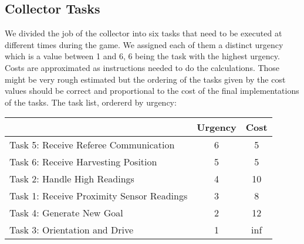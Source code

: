 \documentclass[12pt]{article}
\begin{document}
\subsection*{Collector Tasks}
We divided the job of the collector into six tasks that need to be executed at different times during the game. We assigned each of them a distinct urgency which is a value between 1 and 6, 6 being the task with the highest urgency. Costs are approximated as instructions needed to do the calculations. Those might be very rough estimated but the ordering of the tasks given by the cost values should be correct and proportional to the cost of the final implementations of the tasks.
The task list, ordererd by urgency:\\
\begin{center}
\begin{tabular}{| l | | c | c |}
  \hline			
	& Urgency & Cost \\
  \hline		
  Task 5: Receive Referee Communication & 6 & 5 \\
  Task 6: Receive Harvesting Position & 5 & 5 \\
  Task 2: Handle High Readings & 4 & 10 \\
  Task 1: Receive Proximity Sensor Readings & 3 & 8 \\
  Task 4: Generate New Goal &  2 & 12\\
  Task 3: Orientation and Drive &  1 & inf \\  
  \hline  
\end{tabular}
\end{center}
\end{document}

